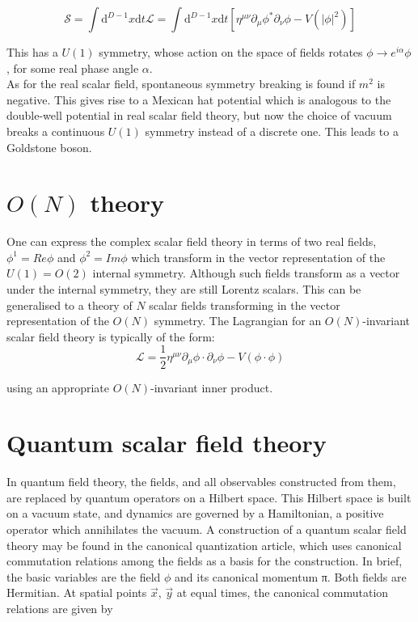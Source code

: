 \begin{equation}
    \mathcal{S}=\int \mathrm{d}^{D-1}x \mathrm{d}t \mathcal{L} = \int \mathrm{d}^{D-1}x \mathrm{d}t \left[\eta^{\mu\nu}\partial_\mu\phi^*\partial_\nu\phi -V(|\phi|^2)\right]
\end{equation}

This has a $U(1)$ symmetry, whose action on the space of fields rotates $\phi\rightarrow e^{i\alpha}\phi$, for some real phase angle $\alpha$.\\

As for the real scalar field, spontaneous symmetry breaking is found if $m^2$ is negative. This gives rise to a Mexican hat potential which is analogous to the double-well potential in real scalar field theory, but now the choice of vacuum breaks a continuous $U(1)$ symmetry instead of a discrete one. This leads to a Goldstone boson.\\

\section{$O(N)$ theory}

One can express the complex scalar field theory in terms of two real fields, $\phi^1=Re{\phi}$ and $\phi^2=Im{\phi}$ which transform in the vector representation of the $U(1)=O(2)$ internal symmetry. Although such fields transform as a vector under the internal symmetry, they are still Lorentz scalars. This can be generalised to a theory of $N$ scalar fields transforming in the vector representation of the $O(N)$ symmetry. The Lagrangian for an $O(N)$-invariant scalar field theory is typically of the form:\\

\begin{equation}
    \mathcal{L}=\frac{1}{2}\eta^{\mu\nu}\partial_\mu\phi\cdot\partial_\nu\phi -V(\phi\cdot\phi)
\end{equation}

using an appropriate $O(N)$-invariant inner product.\\

\section{Quantum scalar field theory}

In quantum field theory, the fields, and all observables constructed from them, are replaced by quantum operators on a Hilbert space. This Hilbert space is built on a vacuum state, and dynamics are governed by a Hamiltonian, a positive operator which annihilates the vacuum. A construction of a quantum scalar field theory may be found in the canonical quantization article, which uses canonical commutation relations among the fields as a basis for the construction. In brief, the basic variables are the field $\phi$ and its canonical momentum π. Both fields are Hermitian. At spatial points $\vec{x}$, $\vec{y}$ at equal times, the canonical commutation relations are given by

